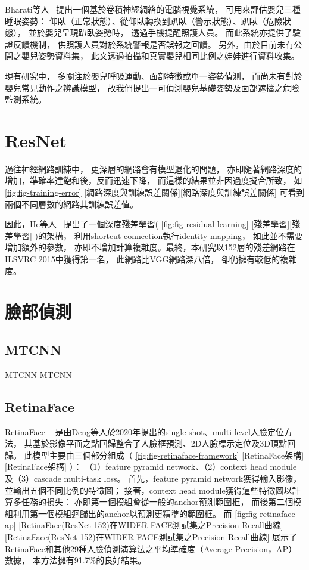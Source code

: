 \documentclass[class=NCU_thesis, crop=false]{standalone}
\begin{document}
Bharati等人~\cite{bharati_efficient_2021}
提出一個基於卷積神經網絡的電腦視覺系統，
可用來評估嬰兒三種睡眠姿勢：
仰臥（正常狀態）、從仰臥轉換到趴臥（警示狀態）、趴臥（危險狀態），
並於嬰兒呈現趴臥姿勢時，
透過手機提醒照護人員。
而此系統亦提供了驗證反饋機制，
供照護人員對於系統警報是否誤報之回饋。
另外，由於目前未有公開之嬰兒姿勢資料集，
此文透過拍攝和真實嬰兒相同比例之娃娃進行資料收集。

現有研究中，
多關注於嬰兒呼吸運動、面部特徵或單一姿勢偵測，
而尚未有對於嬰兒常見動作之辨識模型，
故我們提出一可偵測嬰兒基礎姿勢及面部遮擋之危險監測系統。

\section{ResNet}
過往神經網路訓練中，
更深層的網路會有模型退化的問題，
亦即隨著網路深度的增加，準確率達飽和後，反而迅速下降，
而這樣的結果並非因過度擬合所致，
如\cref{fig:fig-training-error}
[網路深度與訓練誤差關係][網路深度與訓練誤差關係]
可看到兩個不同層數的網路其訓練誤差值。

因此，He等人~\cite{he_deep_2016}
提出了一個深度殘差學習(
\cref{fig:fig-residual-learning}
[殘差學習][殘差學習]
)的架構，
利用shortcut connection執行identity mapping，
如此並不需要增加額外的參數，
亦即不增加計算複雜度。最終，本研究以152層的殘差網路在ILSVRC 2015中獲得第一名，
此網路比VGG網路深八倍，
卻仍擁有較低的複雜度。

\section{臉部偵測}
\subsection{MTCNN}
MTCNN MTCNN
~\cite{xiang_joint_2017}

\subsection{RetinaFace}
RetinaFace
~\cite{deng_retinaface_2020}
是由Deng等人於2020年提出的single-shot、multi-level人臉定位方法，
其基於影像平面之點回歸整合了人臉框預測、2D人臉標示定位及3D頂點回歸。
此模型主要由三個部分組成（
\cref{fig:fig-retinaface-framework}
[RetinaFace架構][RetinaFace架構]
）：
（1）feature pyramid network、（2）context head module及（3）cascade multi-task loss。
首先，feature pyramid network獲得輸入影像，並輸出五個不同比例的特徵圖；
接著，context head module獲得這些特徵圖以計算多任務的損失：
亦即第一個模組會從一般的anchor預測範圍框，
而後第二個模組利用第一個模組迴歸出的anchor以預測更精準的範圍框。
而
\cref{fig:fig-retinaface-ap}
[RetinaFace(ResNet-152)在WIDER FACE測試集之Precision-Recall曲線][RetinaFace(ResNet-152)在WIDER FACE測試集之Precision-Recall曲線]
展示了RetinaFace和其他29種人臉偵測演算法之平均準確度（Average Precision，AP）數據，
本方法擁有91.7\%的良好結果。
\end{document}
